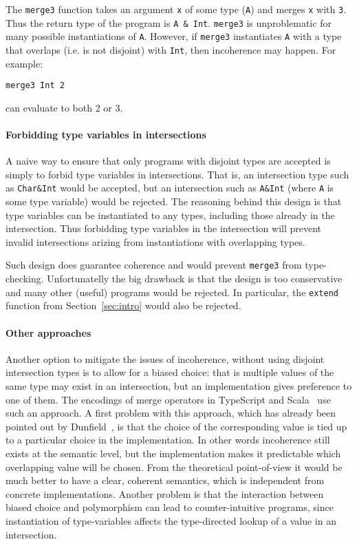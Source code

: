 \noindent The \lstinline{merge3} function takes an argument
\lstinline{x} of some type (\lstinline{A}) and merges \lstinline{x}
with \lstinline{3}. Thus the return type of the program is
\lstinline{A & Int}. \lstinline{merge3} is unproblematic for many
possible instantiations of \lstinline{A}.  However, if
\lstinline{merge3} instantiates \lstinline{A} with a type that
overlaps (i.e. is not disjoint) with \lstinline{Int}, then incoherence may happen.
For example:

\begin{lstlisting}
merge3 Int 2
\end{lstlisting}

\noindent can evaluate to both 2 or 3. 

\paragraph{Forbidding type variables in intersections} 
A naive way to ensure that only programs with disjoint types are accepted is 
simply to forbid type variables in intersections. That is, an
intersection type such as \lstinline{Char&Int} would be accepted, 
but an intersection such as \lstinline{A&Int} (where \lstinline{A} is
some type variable) would be rejected. The reasoning behind this
design is that type variables can be instantiated to any types,
including those already in the intersection. Thus forbidding type
variables in the intersection will prevent invalid intersections
arizing from instantiations with overlapping types.

Such design does guarantee coherence and would prevent
\lstinline{merge3} from type-checking. Unfortunatelly the big drawback
is that the design is too conservative and many other (useful) programs would be 
rejected. In particular, the \lstinline{extend} function from Section~\ref{sec:intro}
would also be rejected. 

\paragraph{Other approaches}
Another option to mitigate the issues of incoherence, without using
disjoint intersection types is to allow for a biased choice: that is
multiple values of the same type may exist in an intersection, but an
implementation gives preference to one of them. The encodings of merge 
operators in TypeScript and Scala~\cite{oliveira2013feature} use such an approach.
A first problem with this approach, which has already been pointed out by
Dunfield~\cite{dunfield2014elaborating}, is that the choice of the corresponding value is
tied up to a particular choice in the implementation. In other words
incoherence still exists at the semantic level, but the implementation makes it predictable 
which overlapping value will be chosen. From the
theoretical point-of-view it would be much better to have a clear,
coherent semantics, which is independent from concrete implementations.
Another problem is that the interaction between 
biased choice and polymorphism can lead to counter-intuitive programs, since
instantiation of type-variables affects the type-directed lookup of a
value in an intersection.

